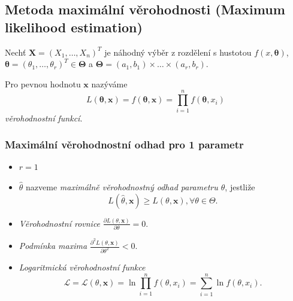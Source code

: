 \subsection{Metoda maximální věrohodnosti (Maximum likelihood estimation)} 
Nechť $\mathbf{X}=\left(X_1,\ldots,X_n\right)^T$ je náhodný výběr z rozdělení s hustotou $f\left( x,\pmb{\theta}\right)$, $\pmb{\theta}=\left(\theta_1,\ldots,\theta_r\right)^T \in \pmb{\Theta}$ a $\pmb{\Theta} = \left(a_1, b_1\right)\times \ldots \times \left(a_r, b_r\right)$.

Pro pevnou hodnotu $\mathbf{x}$ nazýváme $$L \left(\pmb{\theta}, \mathbf{x} \right) = f\left(\pmb{\theta}, \mathbf{x} \right) = \prod_{i=1}^{n} f\left(\pmb{\theta},x_i \right) $$ \textit{věrohodnostní funkcí}.

\subsubsection{Maximální věrohodnostní odhad pro 1 parametr}
\begin{itemize}
\item $r=1$
\item $\hat{\theta}$ nazveme \textit{maximálně věrohodnostný odhad parametru $\theta$}, jestliže $$L \left(\hat{\theta}, \mathbf{x} \right) \geq L \left(\theta, \mathbf{x} \right), \forall \theta \in \Theta.$$
\item \textit{Věrohodnostní rovnice} $\frac{\partial L \left(\theta, \mathbf{x} \right)}{\partial \theta} = 0.$
\item \textit{Podmínka maxima} $\frac{\partial^2 L \left(\theta, \mathbf{x} \right)}{\partial \theta^2} < 0.$
\item \textit{Logaritmická věrohodnostní funkce} $$\mathcal{L} = \mathcal{L} \left(\theta, \mathbf{x} \right) = \ln \prod_{i=1}^{n} f\left(\theta,x_i \right) = \sum_{i=1}^{n} \ln f\left(\theta,x_i \right).$$
\end{itemize}

